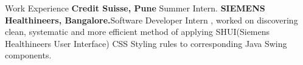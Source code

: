 \begin{rubric}{Work Experience}
%
	\textbf{Credit Suisse, Pune} Summer Intern.
%
%
%
	\textbf{SIEMENS Healthineers, Bangalore.}Software Developer Intern , worked on discovering clean, systematic and more efficient method of applying SHUI(Siemens Healthineers User Interface) CSS Styling rules to corresponding Java Swing components. 
%
\end{rubric}